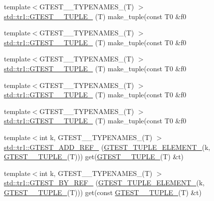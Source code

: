 \begin{DoxyCompactItemize}
{\footnotesize template$<$G\+T\+E\+S\+T\+\_\+\_\+\+T\+Y\+P\+E\+N\+A\+M\+E\+S\+\_\+(\+T) $>$ }\\\mbox{\hyperlink{namespacestd_1_1tr1_a31cde155977a4544af2b44b51ffe69ac}{std\+::tr1\+::\+G\+T\+E\+S\+T\+\_\+\_\+\+T\+U\+P\+L\+E\+\_\+}} (T) make\+\_\+tuple(const T0 \&f0
\item 
{\footnotesize template$<$G\+T\+E\+S\+T\+\_\+\_\+\+T\+Y\+P\+E\+N\+A\+M\+E\+S\+\_\+(\+T) $>$ }\\\mbox{\hyperlink{namespacestd_1_1tr1_a61277f5af24b20fce87a9fd94307ab34}{std\+::tr1\+::\+G\+T\+E\+S\+T\+\_\+\_\+\+T\+U\+P\+L\+E\+\_\+}} (T) make\+\_\+tuple(const T0 \&f0
\item 
{\footnotesize template$<$G\+T\+E\+S\+T\+\_\+\_\+\+T\+Y\+P\+E\+N\+A\+M\+E\+S\+\_\+(\+T) $>$ }\\\mbox{\hyperlink{namespacestd_1_1tr1_a29c8efcb79a4749e079b704c418266e6}{std\+::tr1\+::\+G\+T\+E\+S\+T\+\_\+\_\+\+T\+U\+P\+L\+E\+\_\+}} (T) make\+\_\+tuple(const T0 \&f0
\item 
{\footnotesize template$<$G\+T\+E\+S\+T\+\_\+\_\+\+T\+Y\+P\+E\+N\+A\+M\+E\+S\+\_\+(\+T) $>$ }\\\mbox{\hyperlink{namespacestd_1_1tr1_a6afad1f98814ccc897d0b02bc6fc4e7d}{std\+::tr1\+::\+G\+T\+E\+S\+T\+\_\+\_\+\+T\+U\+P\+L\+E\+\_\+}} (T) make\+\_\+tuple(const T0 \&f0
\item 
{\footnotesize template$<$G\+T\+E\+S\+T\+\_\+\_\+\+T\+Y\+P\+E\+N\+A\+M\+E\+S\+\_\+(\+T) $>$ }\\\mbox{\hyperlink{namespacestd_1_1tr1_aa636d3269bf1f368a7bc09ff158bc482}{std\+::tr1\+::\+G\+T\+E\+S\+T\+\_\+\_\+\+T\+U\+P\+L\+E\+\_\+}} (T) make\+\_\+tuple(const T0 \&f0
\item 
{\footnotesize template$<$int k, G\+T\+E\+S\+T\+\_\+\_\+\+T\+Y\+P\+E\+N\+A\+M\+E\+S\+\_\+(\+T) $>$ }\\\mbox{\hyperlink{namespacestd_1_1tr1_a495d7fb7a131317a9ba985598d3c1504}{std\+::tr1\+::\+G\+T\+E\+S\+T\+\_\+\+A\+D\+D\+\_\+\+R\+E\+F\+\_\+}} (\mbox{\hyperlink{gtest-tuple_8h_a1b7f133d8aa02e0b7afed7b66781eeb7}{G\+T\+E\+S\+T\+\_\+\+T\+U\+P\+L\+E\+\_\+\+E\+L\+E\+M\+E\+N\+T\+\_\+}}(k, \mbox{\hyperlink{gtest-tuple_8h_a275e7bcd84299cc44b9c1dba971951c4}{G\+T\+E\+S\+T\+\_\+\_\+\+T\+U\+P\+L\+E\+\_\+}}(T))) get(\mbox{\hyperlink{gtest-tuple_8h_a275e7bcd84299cc44b9c1dba971951c4}{G\+T\+E\+S\+T\+\_\+\_\+\+T\+U\+P\+L\+E\+\_\+}}(T) \&t)
\item 
{\footnotesize template$<$int k, G\+T\+E\+S\+T\+\_\+\_\+\+T\+Y\+P\+E\+N\+A\+M\+E\+S\+\_\+(\+T) $>$ }\\\mbox{\hyperlink{namespacestd_1_1tr1_ae7b5ea477ac34a3eef5c4c15c42b76ed}{std\+::tr1\+::\+G\+T\+E\+S\+T\+\_\+\+B\+Y\+\_\+\+R\+E\+F\+\_\+}} (\mbox{\hyperlink{gtest-tuple_8h_a1b7f133d8aa02e0b7afed7b66781eeb7}{G\+T\+E\+S\+T\+\_\+\+T\+U\+P\+L\+E\+\_\+\+E\+L\+E\+M\+E\+N\+T\+\_\+}}(k, \mbox{\hyperlink{gtest-tuple_8h_a275e7bcd84299cc44b9c1dba971951c4}{G\+T\+E\+S\+T\+\_\+\_\+\+T\+U\+P\+L\+E\+\_\+}}(T))) get(const \mbox{\hyperlink{gtest-tuple_8h_a275e7bcd84299cc44b9c1dba971951c4}{G\+T\+E\+S\+T\+\_\+\_\+\+T\+U\+P\+L\+E\+\_\+}}(T) \&t)

\end{DoxyCompactItemize}
